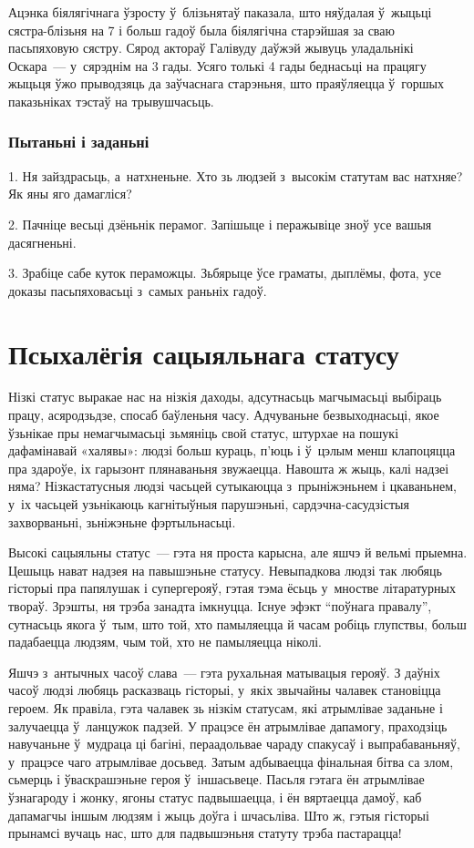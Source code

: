 Ацэнка біялягічнага ўзросту ў~блізьнятаў паказала, што няўдалая ў~жыцьці сястра-блізьня на 7 і больш гадоў была біялягічна старэйшая за сваю пасьпяховую сястру. Сярод актораў Галівуду даўжэй жывуць уладальнікі Оскара~--- у~сярэднім на 3 гады. Усяго толькі 4 гады беднасьці на працягу жыцьця ўжо прыводзяць да заўчаснага старэньня, што праяўляецца ў~горшых паказьніках тэстаў на трывушчасьць.

\subsubsection{Пытаньні і заданьні}

1. Ня зайздрасьць, а~натхненьне. Хто зь людзей з~высокім статутам вас натхняе? Як яны яго дамагліся?

2. Пачніце весьці дзёньнік перамог. Запішыце і перажывіце зноў усе вашыя дасягненьні.

3. Зрабіце сабе куток пераможцы. Зьбярыце ўсе граматы, дыплёмы, фота, усе доказы пасьпяховасьці з~самых раньніх гадоў.


\section{Псыхалёгія сацыяльнага статусу}

Нізкі статус выракае нас на нізкія даходы, адсутнасьць магчымасьці выбіраць працу, асяродзьдзе, спосаб баўленьня часу. Адчуваньне безвыходнасьці, якое ўзьнікае пры немагчымасьці зьмяніць свой статус, штурхае на пошукі дафамінавай «халявы»: людзі больш кураць, п'юць і ў~цэлым менш клапоцяцца пра здароўе, іх гарызонт плянаваньня звужаецца. Навошта ж жыць, калі надзеі няма? Нізкастатусныя людзі часьцей сутыкаюцца з~прыніжэньнем і цкаваньнем, у~іх часьцей узьнікаюць кагнітыўныя парушэньні, сардэчна-сасудзістыя захворваньні, зьніжэньне фэртыльнасьці.

Высокі сацыяльны статус~--- гэта ня проста карысна, але яшчэ й вельмі прыемна. Цешыць нават надзея на павышэньне статусу. Невыпадкова людзі так любяць гісторыі пра папялушак і супергерояў, гэтая тэма ёсьць у~мностве літаратурных твораў. Зрэшты, ня трэба занадта імкнуцца. Існуе эфэкт ``поўнага правалу'', сутнасьць якога ў~тым, што той, хто памыляецца й часам робіць глупствы, больш падабаецца людзям, чым той, хто не памыляецца ніколі.

Яшчэ з~антычных часоў слава~--- гэта рухальная матывацыя герояў. З даўніх часоў людзі любяць расказваць гісторыі, у~якіх звычайны чалавек становіцца героем. Як правіла, гэта чалавек зь нізкім статусам, які атрымлівае заданьне і залучаецца ў~ланцужок падзей. У працэсе ён атрымлівае дапамогу, праходзіць навучаньне ў~мудраца ці багіні, пераадольвае чараду спакусаў і выпрабаваньняў, у~працэсе чаго атрымлівае досьвед. Затым адбываецца фінальная бітва са злом, сьмерць і ўваскрашэньне героя ў~іншасьвеце. Пасьля гэтага ён атрымлівае ўзнагароду і жонку, ягоны статус падвышаецца, і ён вяртаецца дамоў, каб дапамагчы іншым людзям і жыць доўга і шчасьліва. Што ж, гэтыя гісторыі прынамсі вучаць нас, што для падвышэньня статуту трэба пастарацца!

